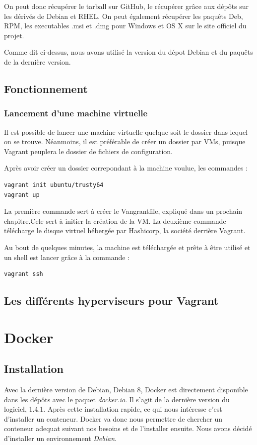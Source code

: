 \documentclass[12pt,a4paper]{article}
\begin{document}
On peut donc récupérer le tarball sur GitHub, le récupérer grâce aux dépôts sur les dérivés de Debian et RHEL. On peut également récupérer les paquêts Deb, RPM, les executables .msi et .dmg pour Windows et OS X sur le site officiel du projet.

Comme dit ci-dessus, nous avons utilisé la version du dépot Debian et du paquêts de la dernière version.

\subsection{Fonctionnement}
\subsubsection{Lancement d'une machine virtuelle}
Il est possible de lancer une machine virtuelle quelque soit le dossier dans lequel on se trouve. Néanmoins, il est préférable de créer un dossier par VMs, puisque Vagrant peuplera le dossier de fichiers de configuration.

Après avoir créer un dossier correpondant à la machine voulue, les commandes : 
\begin{lstlisting}
vagrant init ubuntu/trusty64
vagrant up
\end{lstlisting}

La première commande sert à créer le Vangrantfile, expliqué dans un prochain chapitre.Cele sert à initier la création de la VM. La deuxième commande télécharge le disque virtuel hébergée par Hashicorp, la société derrière Vagrant. 

Au bout de quelques minutes, la machine est téléchargée et prête à être utilisé et un shell est lancer grâce à la commande : 
\begin{lstlisting}
vagrant ssh
\end{lstlisting}



\subsection{Les différents hyperviseurs pour Vagrant}

\section{Docker}
\subsection{Installation}
Avec la dernière version de Debian, Debian 8, Docker est directement disponible dans les dépôts avec le paquet \textit{docker.io}. Il s'agit de la dernière version du logiciel, 1.4.1. Après cette installation rapide, ce qui nous intéresse c'est d'installer un conteneur. Docker va donc nous permettre de chercher un conteneur adequat suivant nos besoins et de l'installer ensuite. Nous avons décidé d'installer un environnement \textit{Debian}.
\end{document}
